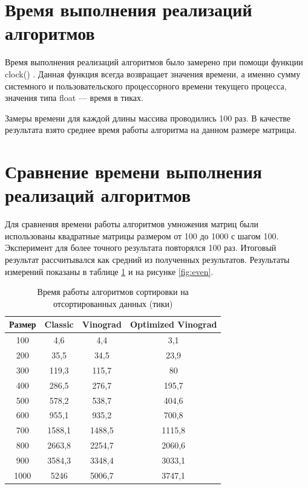 \section{Время выполнения реализаций алгоритмов}

Время выполнения реализаций алгоритмов было замерено при помощи функции clock() \cite{cpplangtime}. Данная функция всегда возвращает значения времени, а именно сумму системного и пользовательского процессорного времени текущего процесса, значения типа float --- время в тиках.

Замеры времени для каждой длины массива проводились 100 раз. В качестве результата взято среднее время работы алгоритма на данном размере матрицы.



\section{Сравнение времени выполнения реализаций алгоритмов}
Для сравнения времени работы алгоритмов умножения матриц были использованы квадратные матрицы размером от 100 до 1000 с шагом 100. Эксперимент для более точного результата повторялся 100 раз. Итоговый результат рассчитывался как средний из полученных результатов. Результаты измерений показаны в таблице \ref{tbl:even} и на рисунке \ref{fig:even}.
\captionsetup{justification=raggedright,singlelinecheck=false}
\begin{table}[H]
	\begin{center}
		\caption{Время работы алгоритмов сортировки на отсортированных данных (тики)}
		\label{tbl:even}
		\begin{tabular}{|c|c|c|c|}
			\hline
			Размер & Classic &  Vinograd &  Optimized Vinograd \\
			\hline
			100&	4,6&	4,4&	3,1\\
			\hline
			200&	35,5&	34,5&	23,9\\
			\hline
			300&	119,3&	115,7&	80\\
			\hline
			400&	286,5&	276,7&	195,7\\
			\hline
			500&	578,2&	538,7&	404,6\\
			\hline
			600&	955,1&	935,2&	700,8\\
			\hline
			700&	1588,1&	1488,5&	1115,8\\
			\hline
			800&	2663,8&	2254,7&	2060,6\\
			\hline
			900&	3584,3&	3348,4&	3033,1\\
			\hline
			1000&	5246&	5006,7&	3747,1\\
			\hline
		\end{tabular}
	\end{center}
	
\end{table}

